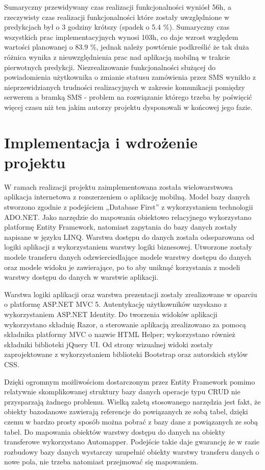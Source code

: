 \documentclass[a4paper,11pt]{article}
\begin{document}
Sumaryczny przewidywany czas realizacji funkcjonalności wyniósł 56h, a rzeczywisty czas realizacji funkcjonalności które zostały uwzględnione w predykcjach był o 3 godziny krótszy (spadek o 5.4 \%). Sumaryczny czas wszystkich prac implementacyjnych wynosi 103h, co daje wzrost względem wartości planowanej o 83.9 \%, jednak należy powtórnie podkreślić że tak duża różnica wynika z nieuwzględnienia prac nad aplikacją mobilną w trakcie pierwotnych predykcji. Niezrealizowanie funkcjonalności służącej do powiadomienia użytkownika o zmianie statusu zamówienia przez SMS wynikło z nieprzewidzianych trudności realizacyjnych w zakresie komunikacji pomiędzy serwerem a bramką SMS - problem na rozwiązanie którego trzeba by poświęcić więcej czasu niż ten jakim autorzy projektu dysponowali w końcowej jego fazie.

\section{Implementacja i wdrożenie projektu}
W ramach realizacji projektu zaimplementowana została wielowarstwowa aplikacja internetowa z rozszerzeniem o aplikację mobilną. Model bazy danych stworzono zgodnie z podejściem „Database First” z wykorzystaniem technologii ADO.NET. Jako narzędzie do mapowania obiektowo relacyjnego wykorzystano platformę Entity Framework, natomiast zapytania do bazy danych zostały napisane w języku LINQ. Warstwa dostępu do danych została odseparowana od logiki aplikacji z wykorzystaniem warstwy logiki biznesowej. Utworzone zostały modele transferu danych odzwierciedlające modele warstwy dostępu do danych oraz modele widoku je zawierające, po to aby uniknąć korzystania z modeli warstwy dostępu do danych w warstwie aplikacji.

Warstwa logiki aplikacji oraz warstwa prezentacji zostały zrealizowane w oparciu o platformę ASP.NET MVC 5. Autentykację użytkowników uzyskano z wykorzystaniem ASP.NET Identity. Do tworzenia widoków aplikacji wykorzystano składnię Razor, a sterowanie aplikacją zrealizowano za pomocą składnika platformy MVC o nazwie HTML Helper; wykorzystano również składniki biblioteki jQuery UI. Od strony wizualnej widoki zostały zaprojektowane z wykorzystaniem biblioteki Bootstrap oraz autorskich stylów CSS.

Dzięki ogromnym możliwościom dostarczonym przez Entity Framework pomimo relatywnie skomplikowanej struktury bazy danych operacje typu CRUD nie przysparzają żadnego problemu. Wielką zaletą stosowanego narzędzia jest fakt, że obiekty bazodanowe zawierają referencje do powiązanych ze sobą tabel, dzięki czemu w bardzo prosty sposób można pobrać z bazy dane z powiązanych ze sobą tabel. Do mapowania obiektów warstwy dostępu do danych na obiekty transferowe wykorzystano Automapper. Podejście takie daje gwarancję że w razie rozbudowy bazy danych wystarczy uzupełnić obiekty warstwy transferu danych o nowe pola, nie trzeba natomiast przejmować się mapowaniem.
\end{document}

